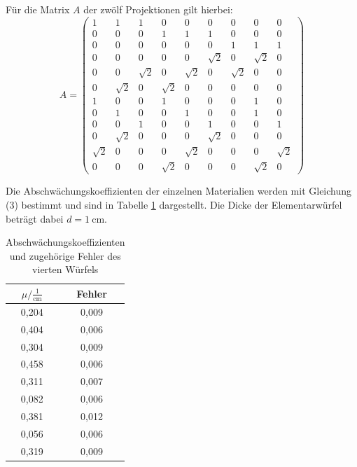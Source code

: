 Für die Matrix $A$ der zwölf Projektionen gilt hierbei:
$$ A =
\left( \begin{matrix}
       1       & 1 &       1 &       0 &        0 &       0 &       0 &       0 &        0      \\
       0       & 0 &       0 &       1 &        1 &       1 &       0 &       0 &        0      \\
       0       & 0 &       0 &       0 &        0 &       0 &       1 &       1 &        1      \\
       0       & 0 &       0 &       0 &        0 &       \sqrt{2}& 0 &       \sqrt{2}&  0      \\
       0       & 0 &       \sqrt{2}& 0 &        \sqrt{2}& 0 &      \sqrt{2}&  0 &       0      \\
       0       & \sqrt{2}& 0 &      \sqrt{2}&   0 &       0 &       0 &       0 &       0      \\
       1       & 0 &       0 &       1 &        0 &       0 &       0 &       1 &       0      \\
       0       & 1 &       0 &       0 &        1 &       0 &       0 &       1 &       0      \\
       0       & 0 &       1 &       0 &        0 &       1 &       0 &       0 &       1      \\
       0       & \sqrt{2}& 0 &       0 &        0 &       \sqrt{2}& 0 &       0 &       0      \\
       \sqrt{2}& 0 &       0 &       0 &        \sqrt{2}& 0 &       0 &       0 &       \sqrt{2}      \\
       0       & 0 &       0 &       \sqrt{2}&  0 &       0 &       0 &       \sqrt{2} & 0
\end{matrix} \right)
$$

Die Abschwächungskoeffizienten der einzelnen Materialien werden mit Gleichung (3) bestimmt und sind in Tabelle \ref{tab:blob} dargestellt.
Die Dicke der Elementarwürfel beträgt dabei $d=\SI{1}{\centi\meter}$.
\begin{table}[H]
  \centering
  \caption{Abschwächungskoeffizienten und zugehörige Fehler des vierten Würfels}
  \label{tab:blob}
  \begin{tabular}{c c}
    \toprule
    $\mu/ \mathrm{\frac{1}{cm}}$ & Fehler   \\
    \midrule
    0,204      &  0,009 \\
    0,404      &  0,006 \\
    0,304      &  0,009 \\
    0,458      &  0,006 \\
    0,311      &  0,007 \\
    0,082      &  0,006 \\
    0,381      &  0,012 \\
    0,056      &  0,006 \\
    0,319      &  0,009 \\
    \bottomrule
  \end{tabular}
\end{table}


